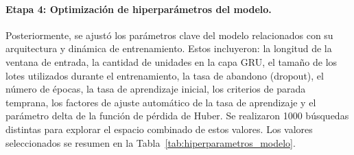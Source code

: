 \paragraph{Etapa 4: Optimización de hiperparámetros del modelo.}
Posteriormente, se ajustó los parámetros clave del modelo relacionados con su arquitectura y dinámica de entrenamiento. Estos incluyeron: la longitud de la ventana de entrada, la cantidad de unidades en la capa GRU, el tamaño de los lotes utilizados durante el entrenamiento, la tasa de abandono (dropout), el número de épocas, la tasa de aprendizaje inicial, los criterios de parada temprana, los factores de ajuste automático de la tasa de aprendizaje y el parámetro delta de la función de pérdida de Huber. Se realizaron 1000 búsquedas distintas para explorar el espacio combinado de estos valores. Los valores seleccionados se resumen en la Tabla~\ref{tab:hiperparametros_modelo}.

